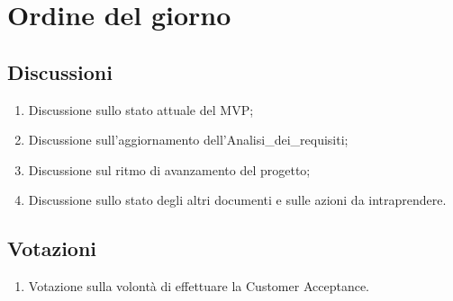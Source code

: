 \section{Ordine del giorno} \label{sec:agenda}
\subsection{Discussioni} \label{subsec:discussione}
\begin{enumerate}
    \item Discussione sullo stato attuale del MVP;
    \item Discussione sull'aggiornamento dell'Analisi\_dei\_requisiti;
    \item Discussione sul ritmo di avanzamento del progetto;
    \item Discussione sullo stato degli altri documenti e sulle azioni da intraprendere.
\end{enumerate}

\subsection{Votazioni} \label{subsec:votazione}
\begin{enumerate}
    \item Votazione sulla volontà di effettuare la Customer Acceptance.
\end{enumerate}